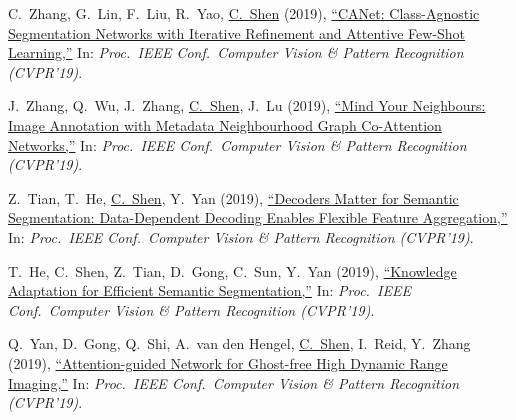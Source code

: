 \documentclass[9pt, a4paper]{article}
\newcommand{\years}[1]{\marginnote{\scriptsize #1}}
\def\highlight{\uline}
\begin{document}
\medskip

\years{2019} C.~Zhang, G.~Lin, F.~Liu, R.~Yao, \highlight{C.~Shen} (2019),
\href{http://www.google.com/search?lr=&ie=UTF-8&oe=UTF-8&q=CANet%3A+Class-Agnostic+Segmentation+Networks+with+Iterative+Refinement+and+Attentive+Few-Shot+Learning+Chi+Zhang%2C+Guosheng+Lin%2C+Fayao+Liu%2C+Rui+Yao%2C+Chunhua+Shen}{``{CANet}: Class-Agnostic Segmentation Networks with Iterative Refinement and Attentive Few-Shot Learning,{}''}
In: \emph{Proc.\ IEEE Conf.\  Computer Vision \& Pattern Recognition (CVPR'19)}.

\medskip

\years{2019} J.~Zhang, Q.~Wu, J.~Zhang, \highlight{C.~Shen}, J.~Lu (2019),
\href{http://www.google.com/search?lr=&ie=UTF-8&oe=UTF-8&q=Mind+Your+Neighbours%3A+Image+Annotation+with+Metadata+Neighbourhood+Graph+Co-Attention+Networks+Junjie+Zhang%2C+Qi+Wu%2C+Jian+Zhang%2C+Chunhua+Shen%2C+Jianfeng+Lu}{``Mind Your Neighbours: Image Annotation with Metadata Neighbourhood Graph Co-Attention Networks,{}''}
In: \emph{Proc.\ IEEE Conf.\  Computer Vision \& Pattern Recognition (CVPR'19)}.

\medskip

\years{2019} Z.~Tian, T.~He, \highlight{C.~Shen}, Y.~Yan (2019),
\href{http://www.google.com/search?lr=&ie=UTF-8&oe=UTF-8&q=Decoders+Matter+for+Semantic+Segmentation%3A+Data-Dependent+Decoding+Enables+Flexible+Feature+Aggregation+Zhi+Tian%2C+Tong+He%2C+Chunhua+Shen%2C+Youliang+Yan}{``Decoders Matter for Semantic Segmentation: Data-Dependent Decoding Enables Flexible Feature Aggregation,{}''}
In: \emph{Proc.\ IEEE Conf.\  Computer Vision \& Pattern Recognition (CVPR'19)}.

\medskip

\years{2019} T.~He, C.~Shen, Z.~Tian, D.~Gong, C.~Sun, Y.~Yan (2019),
\href{http://www.google.com/search?lr=&ie=UTF-8&oe=UTF-8&q=Knowledge+Adaptation+for+Efficient+Semantic+Segmentation+Tong+He%2C+Chunhua++Shen%2C+Zhi+Tian%2C+Dong+Gong%2C+Changming+Sun%2C+Youliang+Yan}{``Knowledge Adaptation for Efficient Semantic Segmentation,{}''}
In: \emph{Proc.\ IEEE Conf.\  Computer Vision \& Pattern Recognition (CVPR'19)}.

\medskip

\years{2019} Q.~Yan, D.~Gong, Q.~Shi, A.~van den Hengel, \highlight{C.~Shen}, I.~Reid, Y.~Zhang (2019),
\href{http://www.google.com/search?lr=&ie=UTF-8&oe=UTF-8&q=Attention-guided+Network+for+Ghost-free+High+Dynamic+Range+Imaging+Qingsen+Yan%2C+Dong+Gong%2C+Qinfeng+Shi%2C+Anton+van+den+Hengel%2C+Chunhua+Shen%2C+Ian+Reid%2C+Yanning+Zhang}{``Attention-guided Network for Ghost-free High Dynamic Range Imaging,{}''}
In: \emph{Proc.\ IEEE Conf.\  Computer Vision \& Pattern Recognition (CVPR'19)}.
\end{document}
